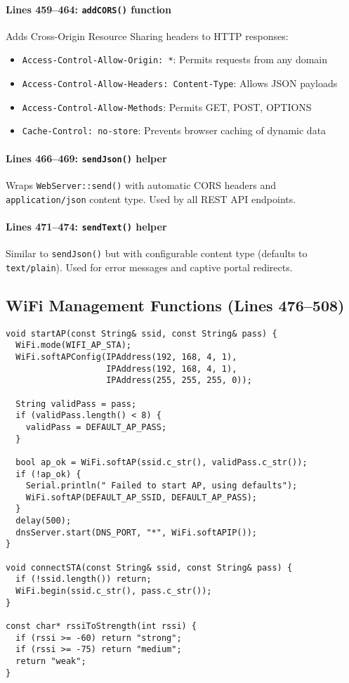 \documentclass[11pt,a4paper]{article}
\begin{document}
\paragraph{Lines 459--464: \texttt{addCORS()} function}
Adds Cross-Origin Resource Sharing headers to HTTP responses:
\begin{itemize}[leftmargin=*]
  \item \texttt{Access-Control-Allow-Origin: *}: Permits requests from any domain
  \item \texttt{Access-Control-Allow-Headers: Content-Type}: Allows JSON payloads
  \item \texttt{Access-Control-Allow-Methods}: Permits GET, POST, OPTIONS
  \item \texttt{Cache-Control: no-store}: Prevents browser caching of dynamic data
\end{itemize}

\paragraph{Lines 466--469: \texttt{sendJson()} helper}
Wraps \texttt{WebServer::send()} with automatic CORS headers and \texttt{application/json} content type. Used by all REST API endpoints.

\paragraph{Lines 471--474: \texttt{sendText()} helper}
Similar to \texttt{sendJson()} but with configurable content type (defaults to \texttt{text/plain}). Used for error messages and captive portal redirects.

\subsection{WiFi Management Functions (Lines 476--508)}

\begin{verbatim}
void startAP(const String& ssid, const String& pass) {
  WiFi.mode(WIFI_AP_STA);
  WiFi.softAPConfig(IPAddress(192, 168, 4, 1), 
                    IPAddress(192, 168, 4, 1), 
                    IPAddress(255, 255, 255, 0));
  
  String validPass = pass;
  if (validPass.length() < 8) {
    validPass = DEFAULT_AP_PASS;
  }
  
  bool ap_ok = WiFi.softAP(ssid.c_str(), validPass.c_str());
  if (!ap_ok) {
    Serial.println(" Failed to start AP, using defaults");
    WiFi.softAP(DEFAULT_AP_SSID, DEFAULT_AP_PASS);
  }
  delay(500);
  dnsServer.start(DNS_PORT, "*", WiFi.softAPIP());
}

void connectSTA(const String& ssid, const String& pass) {
  if (!ssid.length()) return;
  WiFi.begin(ssid.c_str(), pass.c_str());
}

const char* rssiToStrength(int rssi) {
  if (rssi >= -60) return "strong";
  if (rssi >= -75) return "medium";
  return "weak";
}
\end{verbatim}
\end{document}
